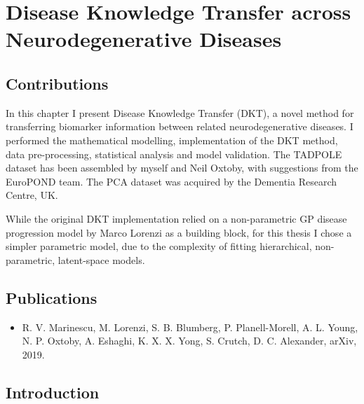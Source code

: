 \chapter{Disease Knowledge Transfer across Neurodegenerative Diseases}
\label{chapter:dkt}

\newcommand{\expFld}{images/}
\newcommand{\jmdFld}{../jointModellingDisease}


\section{Contributions}

In this chapter I present Disease Knowledge Transfer (DKT), a novel method for transferring biomarker information between related neurodegenerative diseases. I performed the mathematical modelling, implementation of the DKT method, data pre-processing, statistical analysis and model validation. The TADPOLE dataset has been assembled by myself and Neil Oxtoby, with suggestions from the EuroPOND team. The PCA dataset was acquired by the Dementia Research Centre, UK. 

While the original DKT implementation relied on a non-parametric GP disease progression model by Marco Lorenzi \cite{lorenzi2017disease} as a building block, for this thesis I chose a simpler parametric model, due to the complexity of fitting hierarchical, non-parametric, latent-space models.

\section{Publications}
\begin{itemize}
 \item R. V. Marinescu, M. Lorenzi, S. B. Blumberg, P. Planell-Morell, A. L. Young, N. P. Oxtoby,  A. Eshaghi, K. X. X. Yong, S. Crutch, D. C. Alexander, arXiv, 2019.
\end{itemize}


\section{Introduction}
\label{sec:dktInt}

